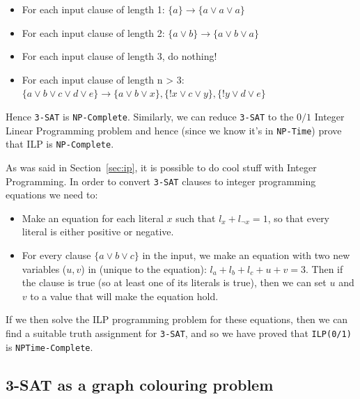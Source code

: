 \begin{itemize}
  \item For each input clause of length 1:
    $\{a\} \rightarrow \{a \vee a \vee a\}$ 
  \item For each input clause of length 2:
    $\{a \vee b\} \rightarrow \{a \vee b \vee a\}$ 
  \item For each input clause of length 3, do nothing!
  \item For each input clause of length n > 3:
    $\{a \vee b \vee c \vee d \vee e\} \rightarrow
      \{a \vee b \vee x\},
      \{!x \vee c \vee y\},
      \{!y \vee d \vee e\}$ 
\end{itemize}

Hence \texttt{3-SAT} is \texttt{NP-Complete}. Similarly, we can reduce
\texttt{3-SAT} to the $0/1$ Integer Linear Programming problem and hence (since
we know it's in \texttt{NP-Time}) prove that ILP is \texttt{NP-Complete}.

As was said in Section~\ref{sec:ip}, it is possible to do cool stuff with
Integer Programming. In order to convert \texttt{3-SAT} clauses to integer
programming equations we need to:

\begin{itemize}
  \item Make an equation for each literal $x$ such that $l_x + l_{\neg x} = 1$,
  so that every literal is either positive or negative.

  \item For every clause $\{a \vee b \vee c\}$ in the input, we make an 
  equation with two new variables ($u,v$) in (unique to the equation):
  $l_a + l_b + l_c + u + v = 3$. Then if the clause is true (so at least one of 
  its literals is true), then we can set $u$ and $v$ to a value that will make 
  the equation hold.
\end{itemize}


If we then solve the ILP programming problem for these equations, then we can
find a suitable truth assignment for \texttt{3-SAT}, and so we have proved that
\texttt{ILP(0/1)} is \texttt{NPTime-Complete}.

\subsection{3-SAT as a graph colouring problem}
\label{sat-colour}


